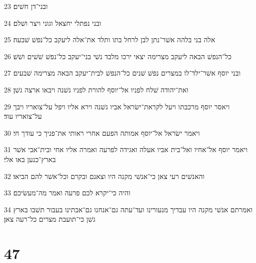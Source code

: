 \par 23 ובני־דן חשׁים׃
\par 24 ובני נפתלי יחצאל וגוני ויצר ושׁלם׃
\par 25 אלה בני בלהה אשׁר־נתן לבן לרחל בתו ותלד את־אלה ליעקב כל־נפשׁ שׁבעה׃
\par 26 כל־הנפשׁ הבאה ליעקב מצרימה יצאי ירכו מלבד נשׁי בני־יעקב כל־נפשׁ שׁשׁים ושׁשׁ׃
\par 27 ובני יוסף אשׁר־ילד־לו במצרים נפשׁ שׁנים כל־הנפשׁ לבית־יעקב הבאה מצרימה שׁבעים׃
\par 28 ואת־יהודה שׁלח לפניו אל־יוסף להורת לפניו גשׁנה ויבאו ארצה גשׁן׃
\par 29 ויאסר יוסף מרכבתו ויעל לקראת־ישׂראל אביו גשׁנה וירא אליו ויפל על־צואריו ויבך על־צואריו עוד׃
\par 30 ויאמר ישׂראל אל־יוסף אמותה הפעם אחרי ראותי את־פניך כי עודך חי׃
\par 31 ויאמר יוסף אל־אחיו ואל־בית אביו אעלה ואגידה לפרעה ואמרה אליו אחי ובית־אבי אשׁר בארץ־כנען באו אלי׃
\par 32 והאנשׁים רעי צאן כי־אנשׁי מקנה היו וצאנם ובקרם וכל־אשׁר להם הביאו׃
\par 33 והיה כי־יקרא לכם פרעה ואמר מה־מעשׂיכם׃
\par 34 ואמרתם אנשׁי מקנה היו עבדיך מנעורינו ועד־עתה גם־אנחנו גם־אבתינו בעבור תשׁבו בארץ גשׁן כי־תועבת מצרים כל־רעה צאן׃

\chapter{47}


